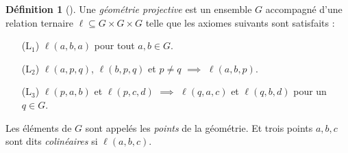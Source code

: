 \documentclass[12pt, oneside]{memoir}
\theoremstyle{definition}
\newtheorem{defn}{Définition}
\begin{document}
\begin{defn}[{\cite[26]{ff00}}]
  Une \textit{géométrie projective} est un ensemble $G$ accompagné
  d'une relation ternaire $\ell \subseteq G \times G \times G$ telle
  que les axiomes suivants sont satisfaits :
  \begin{itemize}[align=left]
  \item[($\text{L}_1$)] $\ell(a,b,a)$ pour tout $a, b \in G$.
  \item[($\text{L}_2$)] $\ell(a,p,q)$, $\ell(b,p,q)$ et $p \neq q$
    $\implies$ $\ell(a,b,p)$.
  \item[($\text{L}_3$)] $\ell(p,a,b)$ et $\ell(p,c,d)$ $\implies$
    $\ell(q,a,c)$ et $\ell(q,b,d)$ pour un $q \in G$.
  \end{itemize}
  Les éléments de $G$ sont appelés les \textit{points} de la
  géométrie. Et trois points $a, b, c$ sont dits \textit{colinéaires}
  si $\ell(a,b,c)$.
\end{defn}
\end{document}
